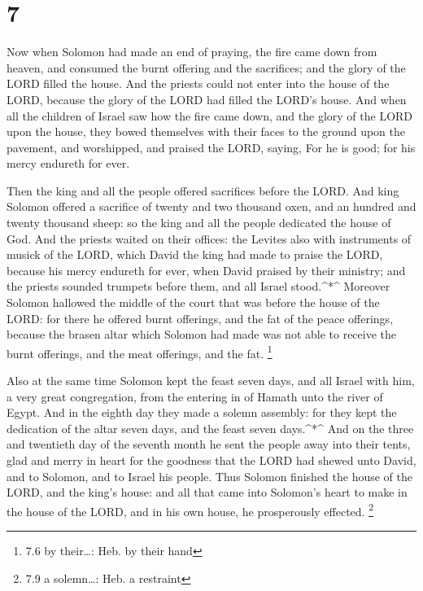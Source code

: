 \hypertarget{section-6}{%
\section{7}\label{section-6}}

 Now when Solomon had made an end of praying, the fire came
down from heaven, and consumed the burnt offering and the sacrifices;
and the glory of the LORD filled the house.  And the priests
could not enter into the house of the LORD, because the glory of the
LORD had filled the LORD's house.  And when all the children
of Israel saw how the fire came down, and the glory of the LORD upon the
house, they bowed themselves with their faces to the ground upon the
pavement, and worshipped, and praised the LORD, saying, For he is good;
for his mercy endureth for ever.

 Then the king and all the people offered sacrifices before
the LORD.  And king Solomon offered a sacrifice of twenty
and two thousand oxen, and an hundred and twenty thousand sheep: so the
king and all the people dedicated the house of God.  And the
priests waited on their offices: the Levites also with instruments of
musick of the LORD, which David the king had made to praise the LORD,
because his mercy endureth for ever, when David praised by their
ministry; and the priests sounded trumpets before them, and all Israel
stood.\^{}*\^{}  Moreover Solomon hallowed the middle of the
court that was before the house of the LORD: for there he offered burnt
offerings, and the fat of the peace offerings, because the brasen altar
which Solomon had made was not able to receive the burnt offerings, and
the meat offerings, and the fat. \footnote{7.6 by their\ldots: Heb. by
  their hand}

 Also at the same time Solomon kept the feast seven days,
and all Israel with him, a very great congregation, from the entering in
of Hamath unto the river of Egypt.  And in the eighth day
they made a solemn assembly: for they kept the dedication of the altar
seven days, and the feast seven days.\^{}*\^{}  And on the
three and twentieth day of the seventh month he sent the people away
into their tents, glad and merry in heart for the goodness that the LORD
had shewed unto David, and to Solomon, and to Israel his people.
 Thus Solomon finished the house of the LORD, and the
king's house: and all that came into Solomon's heart to make in the
house of the LORD, and in his own house, he prosperously effected.
\footnote{7.9 a solemn\ldots: Heb. a restraint}

